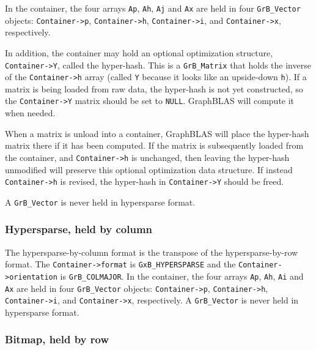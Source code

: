 In the container, the four arrays \verb'Ap', \verb'Ah', \verb'Aj' and \verb'Ax'
are held in four \verb'GrB_Vector' objects:
\verb'Container->p',
\verb'Container->h',
\verb'Container->i', and \newline
\verb'Container->x', respectively.

In addition, the container may hold an optional optimization structure,
\verb'Container->Y', called the hyper-hash.  This is a \verb'GrB_Matrix' that
holds the inverse of the \verb'Container->h' array (called \verb'Y' because it
looks like an upside-down \verb'h').  If a matrix is being loaded from raw
data, the hyper-hash is not yet constructed, so the \verb'Container->Y' matrix
should be set to \verb'NULL'.  GraphBLAS will compute it when needed.

When a matrix is unload into a container, GraphBLAS will place the hyper-hash
matrix there if it has been computed.  If the matrix is subsequently loaded
from the container, and \verb'Container->h' is unchanged, then leaving the
hyper-hash unmodified will preserve this optional optimization data structure.
If instead \verb'Container->h' is revised, the hyper-hash in
\verb'Container->Y' should be freed.

A \verb'GrB_Vector' is never held in hypersparse format.

\subsubsection{Hypersparse, held by column}
\label{format_hypersparse_by_col}

The hypersparse-by-column format is the transpose of the hypersparse-by-row format.
The \verb'Container->format' is \verb'GxB_HYPERSPARSE' and the \newline
\verb'Container->orientation' is \verb'GrB_COLMAJOR'.
In the container, the four arrays \verb'Ap', \verb'Ah', \verb'Ai' and \verb'Ax'
are held in four \verb'GrB_Vector' objects:
\verb'Container->p',
\verb'Container->h',
\verb'Container->i', and
\verb'Container->x', respectively.
A \verb'GrB_Vector' is never held in hypersparse format.

\subsubsection{Bitmap, held by row}
\label{format_bitmap_by_row}

